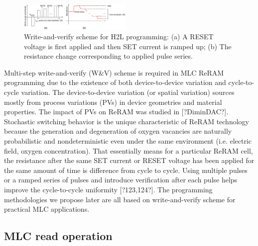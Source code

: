 \begin{figure}[t]
\centering
\includegraphics[width=0.48\textwidth]{fig/WandV}
\vspace{-10pt}
\caption{Write-and-verify scheme for H2L programming: (a) A RESET voltage is first applied and then SET current is ramped up; (b) The resistance change corresponding to applied pulse series.}
\label{fig:wv}
\vspace{-15pt}
\end{figure}

Multi-step write-and-verify (W\&V) scheme is required in MLC ReRAM programming due to the existence of  both device-to-device variation and cycle-to-cycle variation. The device-to-device variation (or spatial variation) sources mostly from process variations (PVs) in device geometries and material properties. The impact of PVs on ReRAM was studied in [?DiminDAC?]. Stochastic switching behavior is the unique characteristic of ReRAM technology because the generation and degeneration of oxygen vacancies are naturally probabilistic and nondeterministic even under the same environment (i.e. electric field, oxygen concentration). That essentially means for a particular ReRAM cell, the resistance after the same SET current or RESET voltage has been applied for the same amount of time is difference from cycle to cycle. Using multiple pulses or a ramped series of pulses and introduce verification after each pulse helps improve the cycle-to-cycle uniformity [?123,124?]. The programming methodologies we propose later are all based on write-and-verify scheme for practical MLC applications.

\subsection{MLC read operation}


